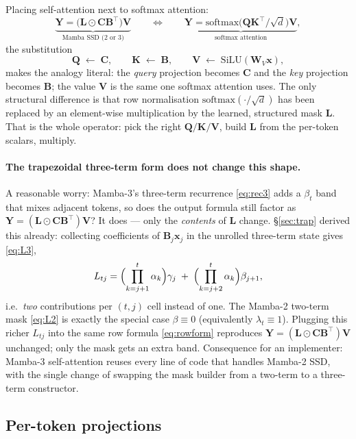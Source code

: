 \documentclass[11pt,a4paper]{article}
\begin{document}
Placing self-attention next to softmax attention:
\[
  \underbrace{\bm{Y} = \bigl(\bm{L}\odot\bm{C}\bm{B}^\top\bigr)\bm{V}}_{\text{Mamba SSD (2 or 3)}}
  \qquad\Longleftrightarrow\qquad
  \underbrace{\bm{Y} = \mathrm{softmax}\!\bigl(\bm{Q}\bm{K}^\top/\sqrt{d}\bigr)\bm{V}}_{\text{softmax attention}},
\]
the substitution
\[
  \bm{Q} \;\leftarrow\; \bm{C},\qquad
  \bm{K} \;\leftarrow\; \bm{B},\qquad
  \bm{V} \;\leftarrow\; \mathrm{SiLU}(\bm{W}_V\bm{x}),
\]
makes the analogy literal: the \emph{query} projection becomes
$\bm{C}$ and the \emph{key} projection becomes $\bm{B}$; the value
$\bm{V}$ is the same one softmax attention uses. The only
structural difference is that row normalisation
$\mathrm{softmax}(\cdot/\sqrt{d})$ has been replaced by an
element-wise multiplication by the learned, structured mask $\bm{L}$.
That is the whole operator: pick the right $\bm{Q}/\bm{K}/\bm{V}$,
build $\bm{L}$ from the per-token scalars, multiply.

\paragraph{The trapezoidal three-term form does not change this shape.}
A reasonable worry: Mamba-3's three-term recurrence \eqref{eq:rec3}
adds a $\beta_t$ band that mixes adjacent tokens, so does the output
formula still factor as $\bm{Y} = (\bm{L}\odot\bm{C}\bm{B}^\top)\bm{V}$?
It does — only the \emph{contents} of $\bm{L}$ change.
\S\ref{sec:trap} derived this already: collecting coefficients of
$\bm{B}_j\bm{x}_j$ in the unrolled three-term state gives
\eqref{eq:L3},
\[
  L_{tj} = \Bigl(\prod_{k=j+1}^{t}\alpha_k\Bigr)\gamma_j
  \;+\; \Bigl(\prod_{k=j+2}^{t}\alpha_k\Bigr)\beta_{j+1},
\]
i.e.\ \emph{two} contributions per $(t,j)$ cell instead of one. The
Mamba-2 two-term mask \eqref{eq:L2} is exactly the special case
$\beta\equiv 0$ (equivalently $\lambda_t\equiv 1$). Plugging this
richer $L_{tj}$ into the same row formula \eqref{eq:rowform}
reproduces $\bm{Y} = (\bm{L}\odot\bm{C}\bm{B}^\top)\bm{V}$ unchanged;
only the mask gets an extra band. Consequence for an implementer:
Mamba-3 self-attention reuses every line of code that handles
Mamba-2 SSD, with the single change of swapping the mask builder
from a two-term to a three-term constructor.

\subsection{Per-token projections}
\end{document}
